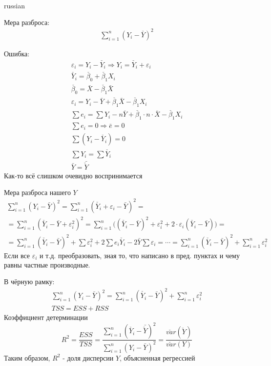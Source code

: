 \documentclass{article}
\begin{document}
\begin{otherlanguage*}{russian}
\begin{enumerate}
Мера разброса: 
\begin{align}
\sum_{i=1}^n (Y_i - \bar{Y})^ 2 
\end{align}

Ошибка: 
\begin{align} 
\varepsilon_i = Y_i - \check{Y_i} \Rightarrow Y_i = \check{Y_i} + \varepsilon_i \\
\check{Y_i} = \check{\beta_0} + \check{\beta_1} X_i \\ 
\check{\beta_0} = \bar{X} - \check{\beta_1} \bar{X} \\ 
\varepsilon_i = Y_i - \bar{Y} + \check{\beta_1} \bar{X} - \check{\beta_1} X_i \\ 
\sum e_i = \sum Y_i - n \bar{Y} + \check{\beta_1} \cdot n \cdot \bar{X} - \check{\beta_1} X_i \\
\sum e_i = 0 \Rightarrow \bar{e} = 0 \\
\sum (Y_i - \check{Y_i}) = 0 \\
\sum Y_i = \sum \check{Y_i} \\
\bar{Y} = \bar{\check{Y}}
\end{align} 
Как-то всё слишком очевидно воспринимается

Мера разброса нашего $Y$ 
\begin{align}
\sum_{i=1}^n (Y_i - \bar{Y})^ 2 = \sum_{i=1}^n (\check{Y_i} + \varepsilon_i - \bar{Y}) ^2 = \\
= \sum_{i=1}^n (\check{Y_i} - \bar{Y} + \varepsilon_i^2)^2 = \sum_{i=1}^n \Big( (\check{Y_i} - \bar{Y} ) ^2 + \varepsilon_i^2 + 2 \cdot \varepsilon_i (\check{Y_i} - \bar{Y}) \Big) = \\
= \sum_{i=1}^n (\check{Y_i} - \bar{Y} )^2 + \sum \varepsilon_i^2 + 2 \sum e_i \check{Y_i} - 2 \bar{Y} \sum \varepsilon_i = \cdots = \sum_{i=1}^n (\check{Y_i} - \bar{Y}) ^ 2 + \sum_{i=1}^n \varepsilon_i^2 
\end{align} 
Если все $\varepsilon_i$ и т.д. преобразовать, зная то, что написано в пред. пунктах и чему равны частные производные. 

В чёрную рамку: 
\begin{align}
\sum_{i=1}^n (Y_i - \bar{Y})^2 = \sum_{i=1}^n (\check{Y_i} - \bar{Y}) ^ 2 + \sum_{i=1}^n \varepsilon_i^2 \\
TSS = ESS + RSS
\end{align}
Коэффициент детерминации 
\begin{equation}
R^2 = \frac{ESS}{TSS} = \frac{\sum_{i=1}^n (\check{Y_i} - \bar{\check{Y}})^2}{\sum_{i=1}^n (Y_i - \bar{Y})^2} = \frac{\check{var} (\check{Y})}{\check{var}(Y)}
\end{equation}
Таким образом, $ R ^ 2 $ - доля дисперсии $ Y $, объясненная регрессией 


\end{enumerate}
\end{otherlanguage*}
\end{document}
